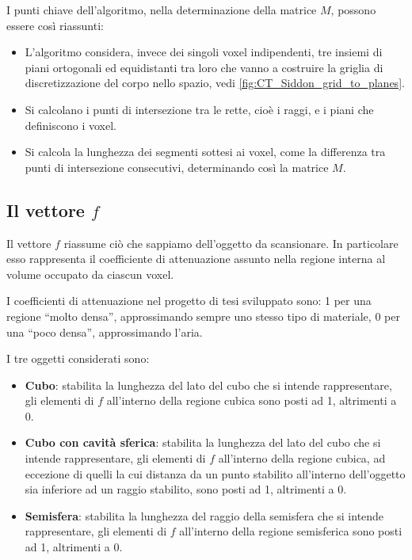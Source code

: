 \documentclass[12pt,a4paper]{report}
\begin{document}
I punti chiave dell'algoritmo, nella determinazione della matrice \(M\), possono essere così riassunti:
\begin{itemize}
  \item L'algoritmo considera, invece dei singoli voxel indipendenti, tre insiemi di piani ortogonali ed equidistanti tra loro che
        vanno a costruire la griglia di discretizzazione del corpo nello spazio, vedi \autoref{fig:CT_Siddon_grid_to_planes}.
  \item Si calcolano i punti di intersezione tra le rette, cioè i raggi, e i piani che definiscono i voxel.
  \item Si calcola la lunghezza dei segmenti sottesi ai voxel, come la differenza tra punti di intersezione consecutivi,
        determinando così la matrice \(M\).
\end{itemize}

\subsection{Il vettore \texorpdfstring{\(f\)}{f}} \label{chap:vector_f}

Il vettore \(f\) riassume ciò che sappiamo dell'oggetto da scansionare.
In particolare esso rappresenta il coefficiente di attenuazione assunto nella regione interna al volume occupato da ciascun voxel.

I coefficienti di attenuazione nel progetto di tesi sviluppato sono: 1 per una regione ``molto densa'', approssimando sempre uno
stesso tipo di materiale, 0 per una ``poco densa'', approssimando l'aria.

I tre oggetti considerati sono:
\begin{itemize}
  \item \textbf{Cubo}: stabilita la lunghezza del lato del cubo che si intende rappresentare, gli elementi di \(f\) all'interno
        della regione cubica sono posti ad 1, altrimenti a 0.
  \item \textbf{Cubo con cavità sferica}: stabilita la lunghezza del lato del cubo che si intende rappresentare, gli elementi
        di \(f\) all'interno della regione cubica, ad eccezione di quelli la cui distanza da un punto stabilito all'interno
        dell'oggetto sia inferiore ad un raggio stabilito, sono posti ad 1, altrimenti a 0.
  \item \textbf{Semisfera}: stabilita la lunghezza del raggio della semisfera che si intende rappresentare, gli elementi di
        \(f\) all'interno della regione semisferica sono posti ad 1, altrimenti a 0.
\end{itemize}
\end{document}
